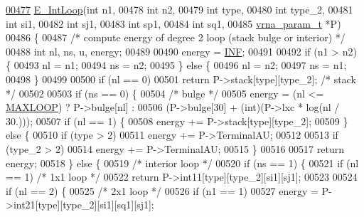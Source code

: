 \begin{DoxyCode}
\hyperlink{group__eval__deprecated_gaafbc187b7f78e8e82afb77dd6f3b8fc5}{00477} \hyperlink{group__eval__deprecated_gaafbc187b7f78e8e82afb77dd6f3b8fc5}{E\_IntLoop}(\textcolor{keywordtype}{int}           n1,
00478           \textcolor{keywordtype}{int}           n2,
00479           \textcolor{keywordtype}{int}           type,
00480           \textcolor{keywordtype}{int}           type\_2,
00481           \textcolor{keywordtype}{int}           si1,
00482           \textcolor{keywordtype}{int}           sj1,
00483           \textcolor{keywordtype}{int}           sp1,
00484           \textcolor{keywordtype}{int}           sq1,
00485           \hyperlink{group__energy__parameters_structvrna__param__s}{vrna\_param\_t}  *P)
00486 \{
00487   \textcolor{comment}{/* compute energy of degree 2 loop (stack bulge or interior) */}
00488   \textcolor{keywordtype}{int} nl, ns, u, energy;
00489 
00490   energy = \hyperlink{constants_8h_a12c2040f25d8e3a7b9e1c2024c618cb6}{INF};
00491 
00492   \textcolor{keywordflow}{if} (n1 > n2) \{
00493     nl  = n1;
00494     ns  = n2;
00495   \} \textcolor{keywordflow}{else} \{
00496     nl  = n2;
00497     ns  = n1;
00498   \}
00499 
00500   \textcolor{keywordflow}{if} (nl == 0)
00501     \textcolor{keywordflow}{return} P->stack[type][type\_2];  \textcolor{comment}{/* stack */}
00502 
00503   \textcolor{keywordflow}{if} (ns == 0) \{
00504     \textcolor{comment}{/* bulge */}
00505     energy = (nl <= \hyperlink{constants_8h_ad1bd6eabac419670ddd3c9ed82145988}{MAXLOOP}) ? P->bulge[nl] :
00506              (P->bulge[30] + (\textcolor{keywordtype}{int})(P->lxc * log(nl / 30.)));
00507     \textcolor{keywordflow}{if} (nl == 1) \{
00508       energy += P->stack[type][type\_2];
00509     \} \textcolor{keywordflow}{else} \{
00510       \textcolor{keywordflow}{if} (type > 2)
00511         energy += P->TerminalAU;
00512 
00513       \textcolor{keywordflow}{if} (type\_2 > 2)
00514         energy += P->TerminalAU;
00515     \}
00516 
00517     \textcolor{keywordflow}{return} energy;
00518   \} \textcolor{keywordflow}{else} \{
00519     \textcolor{comment}{/* interior loop */}
00520     \textcolor{keywordflow}{if} (ns == 1) \{
00521       \textcolor{keywordflow}{if} (nl == 1)                    \textcolor{comment}{/* 1x1 loop */}
00522         \textcolor{keywordflow}{return} P->int11[type][type\_2][si1][sj1];
00523 
00524       \textcolor{keywordflow}{if} (nl == 2) \{
00525         \textcolor{comment}{/* 2x1 loop */}
00526         \textcolor{keywordflow}{if} (n1 == 1)
00527           energy = P->int21[type][type\_2][si1][sq1][sj1];

\end{DoxyCode}

